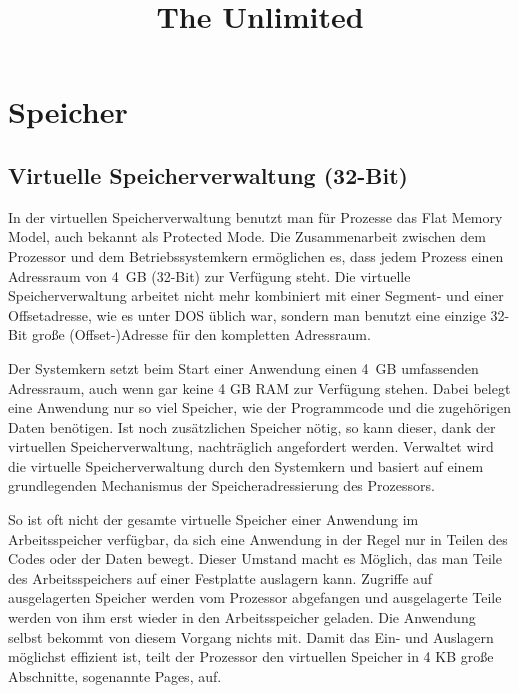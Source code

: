 \documentclass[12pt]{book}
\begin{document}
\title{The Unlimited}
\maketitle

\chapter{Speicher}

\section{Virtuelle Speicherverwaltung (32-Bit)}

In der virtuellen Speicherverwaltung benutzt man für Prozesse das Flat Memory
Model, auch bekannt als Protected Mode. Die Zusammenarbeit zwischen dem
Prozessor und dem Betriebssystemkern ermöglichen es, dass jedem Prozess einen
Adressraum von 4 GB (32-Bit) zur Verfügung steht. Die virtuelle Speicherverwaltung
arbeitet nicht mehr kombiniert mit einer Segment- und einer Offsetadresse, wie
es unter DOS üblich war, sondern man benutzt eine einzige 32-Bit große
(Offset-)Adresse für den kompletten Adressraum.

Der Systemkern setzt beim Start einer Anwendung einen 4 GB umfassenden
Adressraum, auch wenn gar keine 4 GB RAM zur Verfügung stehen. Dabei belegt
eine Anwendung nur so viel Speicher, wie der Programmcode und die zugehörigen
Daten benötigen. Ist noch zusätzlichen Speicher nötig, so kann
dieser, dank der virtuellen Speicherverwaltung, nachträglich angefordert werden.
Verwaltet wird die virtuelle Speicherverwaltung durch den Systemkern und basiert
auf einem grundlegenden Mechanismus der Speicheradressierung des Prozessors.

So ist oft nicht der gesamte virtuelle Speicher einer Anwendung im
Arbeitsspeicher verfügbar, da sich eine Anwendung in der Regel nur in Teilen des
Codes oder der Daten bewegt. Dieser Umstand macht es Möglich, das man Teile des
Arbeitsspeichers auf einer Festplatte auslagern kann. Zugriffe auf ausgelagerten
Speicher werden vom Prozessor abgefangen und ausgelagerte Teile werden von ihm
erst wieder in den Arbeitsspeicher geladen. Die Anwendung selbst bekommt von
diesem Vorgang nichts mit. Damit das Ein- und Auslagern möglichst effizient ist,
teilt der Prozessor den virtuellen Speicher in 4 KB große Abschnitte, sogenannte
Pages, auf.
\end{document}
